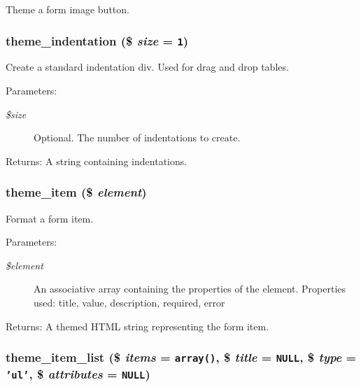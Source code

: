 Theme a form image button. \hypertarget{group__themeable_g3fb21186ce53fffb040c3e1db1504671}{
\subsubsection[{theme\_\-indentation}]{\setlength{\rightskip}{0pt plus 5cm}theme\_\-indentation (\$ {\em size} = {\tt 1})}}
\label{group__themeable_g3fb21186ce53fffb040c3e1db1504671}


Create a standard indentation div. Used for drag and drop tables.

\begin{Desc}
\item[Parameters:]
\begin{description}
\item[{\em \$size}]Optional. The number of indentations to create. \end{description}
\end{Desc}
\begin{Desc}
\item[Returns:]A string containing indentations. \end{Desc}
\hypertarget{group__themeable_g41b3e3d7567fc1fdb6e777d53ef21fc7}{
\subsubsection[{theme\_\-item}]{\setlength{\rightskip}{0pt plus 5cm}theme\_\-item (\$ {\em element})}}
\label{group__themeable_g41b3e3d7567fc1fdb6e777d53ef21fc7}


Format a form item.

\begin{Desc}
\item[Parameters:]
\begin{description}
\item[{\em \$element}]An associative array containing the properties of the element. Properties used: title, value, description, required, error \end{description}
\end{Desc}
\begin{Desc}
\item[Returns:]A themed HTML string representing the form item. \end{Desc}
\hypertarget{group__themeable_g0f8d002d54905d758e38a3d516cbfe69}{
\subsubsection[{theme\_\-item\_\-list}]{\setlength{\rightskip}{0pt plus 5cm}theme\_\-item\_\-list (\$ {\em items} = {\tt array()}, \/  \$ {\em title} = {\tt NULL}, \/  \$ {\em type} = {\tt 'ul'}, \/  \$ {\em attributes} = {\tt NULL})}}
\label{group__themeable_g0f8d002d54905d758e38a3d516cbfe69}


